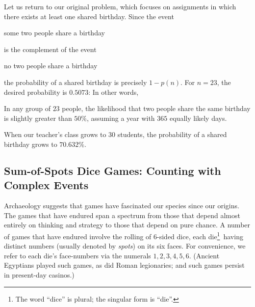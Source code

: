 \medskip

Let us return to our original problem, which focuses on assignments in which there exists at least one shared birthday.  Since the event

\smallskip

\hspace*{.25in}some two people share a birthday

\smallskip

\noindent
is the complement of the event

\smallskip

\hspace*{.25in}no two people share a birthday

\smallskip

\noindent
the probability of a shared birthday is precisely $1-p(n)$.  For $n=23$, the desired probability is $0.5073$:  In other words,

\begin{prop}
In any group of $23$ people, the likelihood that two people share the same birthday is slightly greater than $50\%$, assuming a year with $365$ equally likely days.
\end{prop}

When our teacher's class grows to 30 students, the probability of a shared birthday grows to $70.632\%$.


\subsection{Sum-of-Spots Dice Games: Counting with Complex Events}
\label{sec:three-dice}

Archaeology suggests that games have fascinated our species since our origins.  The 
games that have endured span a spectrum from those that depend almost entirely on thinking and strategy to those that depend on pure chance.  A number of games that have endured involve the rolling of 6-sided dice, each die\footnote{The word ``dice'' is plural; the singular form is ``die''.}~having distinct numbers (usually denoted by {\it spots}) on its six faces.  For convenience, we refer to each die's face-numbers via the numerals $1, 2, 3, 4, 5, 6$. (Ancient Egyptians played such games, as did Roman legionaries;  and such games persist in present-day casinos.)

\smallskip

